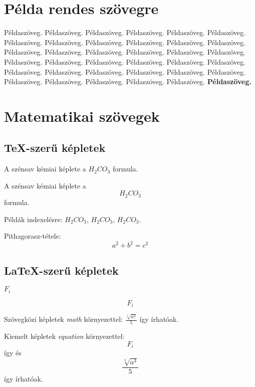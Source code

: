 \documentclass[a4paper,12pt]{article}
\begin{document}
\section{Példa rendes szövegre}

Példaszöveg. Példaszöveg. Példaszöveg. Példaszöveg. Példaszöveg. Példaszöveg. Példaszöveg. Példaszöveg. Példaszöveg. Példaszöveg. Példaszöveg. Példaszöveg. Példaszöveg. Példaszöveg. Példaszöveg. Példaszöveg. Példaszöveg. Példaszöveg. Példaszöveg. Példaszöveg. Példaszöveg. Példaszöveg. Példaszöveg. Példaszöveg. Példaszöveg. Példaszöveg. Példaszöveg. Példaszöveg. Példaszöveg. Példaszöveg. Példaszöveg. Példaszöveg. Példaszöveg. Példaszöveg. {Példaszöveg.}  \textbf{Példaszöveg.}

\section{Matematikai szövegek}

\subsection{\TeX-szerű képletek}

A szénsav kémiai képlete a $H_{2}CO_{3}$ formula. 

A szénsav kémiai képlete a $$H_{2}CO_{3}$$ formula. 

Példák indexelésre: $H_2CO_3$, $H_{2}CO_{3}$, ${H}_{2}C{O}_{3}$.

Pithagorasz-tétele: $$a^{2}+b^{2}=c^{2}$$

\subsection{\LaTeX-szerű képletek}

\( F_{i} \)

\[ F_{i} \]

Szövegközi képletek \textit{math} környezettel: 
\begin{math}
\frac{\sqrt[5]{a^3}}{5}
\end{math}
így írhatóak.

Kiemelt képletek \textit{equation} környezettel: 
\begin{equation}
\label{eq:fi}
F_{i}
\end{equation}
így és
\begin{equation}
\label{eq:tort}
\frac{\sqrt[5]{a^3}}{5}
\end{equation}
így írhatóak.
\end{document}
